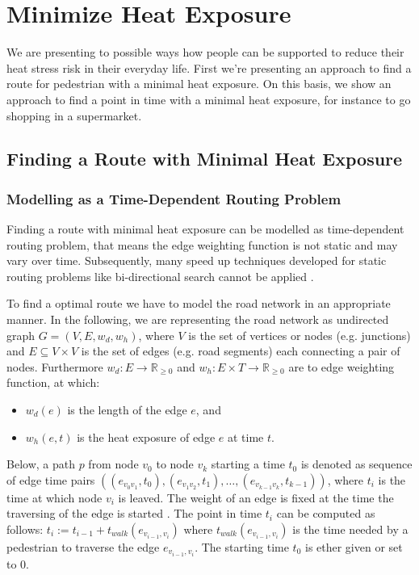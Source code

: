 
\section{Minimize Heat Exposure}

We are presenting to possible ways how people can be supported to reduce their heat stress risk in their everyday life. First we're presenting an approach to find a route for pedestrian with a minimal heat exposure. On this basis, we show an approach to find a point in time with a minimal heat exposure, for instance to go shopping in a supermarket.

\subsection{Finding a Route with Minimal Heat Exposure}

\subsubsection{Modelling as a Time-Dependent Routing Problem}

Finding a route with minimal heat exposure can be modelled as time-dependent routing problem, that means the edge weighting function is not static and may vary over time. Subsequently, many speed up techniques developed for static routing problems like bi-directional search cannot be applied \parencite{Delling2009}. 

To find a optimal route we have to model the road network in an appropriate manner. In the following, we are representing the road network as undirected graph $G=(V,E,w_d,w_h)$, where $V$ is the set of vertices or nodes (e.g. junctions) and $E\subseteq V\times V$ is the set of edges (e.g. road segments) each connecting a pair of nodes. Furthermore $w_d: E \to \mathbb{R}_{\geq 0}$ and $w_h: E \times T \to \mathbb{R}_{\geq 0}$ are to edge weighting function, at which:
\begin{itemize}
	\item $w_d(e)$ is the length of the edge $e$, and
	\item $w_h(e, t)$ is the heat exposure of edge $e$ at time $t$.
\end{itemize}   
Below, a path $p$ from node $v_0$ to node $v_k$ starting a time $t_0$ is denoted as sequence of edge time pairs $((e_{v_0v_1},t_0),(e_{v_1v_2},t_1),\dots, (e_{v_{k-1}v_k},t_{k-1}))$, where $t_i$ is the time at which node $v_i$ is leaved. The weight of an edge is fixed at the time the traversing of the edge is started \parencite[the so-called frozen link model,][]{Orda1990}. The point in time $t_i$ can be computed as follows: $t_i := t_{i-1} + t_{walk}(e_{v_{i-1},v_i})$ where $t_{walk}(e_{v_{i-1},v_i})$ is the time needed by a pedestrian to traverse the edge $e_{v_{i-1},v_i}$. The starting time $t_0$ is ether given or set to $0$. 

